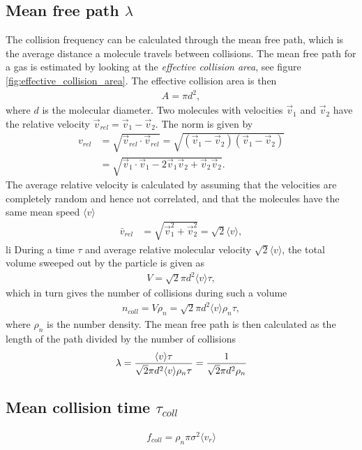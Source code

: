 \subsection{Mean free path $\lambda$}
\label{sec:mean_free_path_calculation}
The collision frequency can be calculated through the mean free path, which is the average distance a molecule travels between collisions. The mean free path for a gas is estimated by looking at the \textit{effective collision area}, see figure \ref{fig:effective_collision_area}. The effective collision area is then
\begin{align}
	A = \pi d^2,
\end{align}
where $d$ is the molecular diameter. Two molecules with velocities $\vec v_1$ and $\vec v_2$ have the relative velocity $\vec v_{rel} = \vec v_1 - \vec v_2$. The norm is given by
\begin{align}
	v_{rel} &= \sqrt{\vec v_{rel}\cdot \vec v_{rel} } = \sqrt{ (\vec v_1 - \vec v_2)(\vec v_1 - \vec v_2)}\\
	&= \sqrt{\vec v_1\cdot \vec v_1 - 2\vec v_1\vec v_2 + \vec v_2\vec v_2}.
\end{align}
The average relative velocity is calculated by assuming that the velocities are completely random and hence not correlated, and that the molecules have the same mean speed $\langle v\rangle$
\begin{align}
	\bar v_{rel} &= \sqrt{\vec v_1^2 + \vec v_2^2} = \sqrt 2 \langle v\rangle,
\end{align}li
During a time $\tau$ and average relative molecular velocity $\sqrt 2 \langle v\rangle$, the total volume sweeped out by the particle is given as
\begin{align}
	V = \sqrt 2 \pi d^2\langle v\rangle \tau,
\end{align}
which in turn gives the number of collisions during such a volume
\begin{align}
	\label{eq:num_collisions}
	n_{coll} = V\rho_n = \sqrt 2 \pi d^2\langle v\rangle \rho_n \tau,
\end{align}
where $\rho_n$ is the number density. The mean free path is then calculated as the length of the path divided by the number of collisions
\begin{align}
	\lambda = {\langle v\rangle \tau\over \sqrt 2 \pi d^2\langle v\rangle \rho_n\tau} = {1 \over \sqrt 2 \pi d^2 \rho_n}
\end{align}
\subsection{Mean collision time $\tau_{coll}$}
\begin{align}
	\label{eq:coll_frequency}
	f_{coll} = \rho_n \pi \sigma^2 \langle v_r \rangle
\end{align}